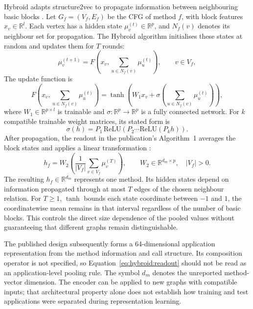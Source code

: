 Hybroid adapts structure2vec to propagate information between neighbouring basic blocks
\cite{dai2016discriminative, norouzian2021hybroid}. Let $G_f=(V_f,E_f)$ be the CFG of method $f$,
with block features $x_v\in\mathbb R^l$. Each vertex has a hidden state
$\mu_v^{(t)}\in\mathbb R^p$, and $N_f(v)$ denotes its neighbour set for propagation.
The Hybroid algorithm initialises these states at random and updates them for $T$ rounds:
%
\begin{equation}
  \mu_v^{(t+1)} = F\!\left(x_v, \sum_{u \in N_f(v)} \mu_u^{(t)}\right), \qquad v \in V_f,
  \label{eq:hybroid:meanfield}
\end{equation}
%
The update function is
%
\begin{equation}
  F\!\left(x_v, \sum_{u \in N_f(v)} \mu_u^{(t)}\right)
  = \tanh\!\left(W_1 x_v + \sigma\!\left(\sum_{u \in N_f(v)} \mu_u^{(t)}\right)\right),
  \label{eq:hybroid:update}
\end{equation}
%
where $W_1\in\mathbb R^{p\times l}$ is trainable and
$\sigma:\mathbb R^p\rightarrow\mathbb R^p$ is a fully connected network. For $k$ compatible
trainable weight matrices, its stated form is
%
\begin{equation}
  \sigma(h) = P_1\,\mathrm{ReLU}\!\left(P_2 \cdots \mathrm{ReLU}(P_k h)\right).
  \label{eq:hybroid:sigma}
\end{equation}
%
After propagation, the readout in the publication's Algorithm~1 averages the block states and
applies a linear transformation \cite{norouzian2021hybroid}:
\begin{equation}
  h_f = W_2\left(\frac{1}{|V_f|}\sum_{v\in V_f}\mu_v^{(T)}\right),
  \qquad W_2\in\mathbb R^{d_m\times p},\quad |V_f|>0.
  \label{eq:hybroid:readout}
\end{equation}
The resulting $h_f\in\mathbb R^{d_m}$ represents one method. Its hidden states depend on
information propagated through at most $T$ edges of the chosen neighbour relation. For $T\geq1$,
$\tanh$ bounds each state coordinate between $-1$ and $1$, the coordinatewise mean remains
in that interval regardless of the number of basic blocks. This controls the direct size
dependence of the pooled values without guaranteeing that different graphs remain distinguishable.

The published design subsequently forms a 64-dimensional application representation from the
method information and call structure. Its composition operator is not specified, so
Equation~\ref{eq:hybroid:readout} should not be read as an application-level pooling rule.
The symbol $d_m$ denotes the unreported method-vector dimension. The encoder can be applied
to new graphs with compatible inputs; that architectural
property alone does not establish how training and test applications were separated during
representation learning.

